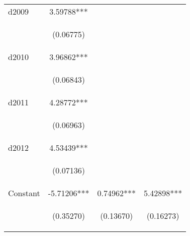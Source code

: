 \begin{center}
\begin{tabular}{lccc}
d2009 & 3.59788*** &  &  \\
\vspace{4pt} & \begin{footnotesize}(0.06775)\end{footnotesize} & \begin{footnotesize}\end{footnotesize} & \begin{footnotesize}\end{footnotesize} \\
d2010 & 3.96862*** &  &  \\
\vspace{4pt} & \begin{footnotesize}(0.06843)\end{footnotesize} & \begin{footnotesize}\end{footnotesize} & \begin{footnotesize}\end{footnotesize} \\
d2011 & 4.28772*** &  &  \\
\vspace{4pt} & \begin{footnotesize}(0.06963)\end{footnotesize} & \begin{footnotesize}\end{footnotesize} & \begin{footnotesize}\end{footnotesize} \\
d2012 & 4.53439*** &  &  \\
\vspace{4pt} & \begin{footnotesize}(0.07136)\end{footnotesize} & \begin{footnotesize}\end{footnotesize} & \begin{footnotesize}\end{footnotesize} \\
Constant & -5.71206*** & 0.74962*** & 5.42898*** \\
 & \begin{footnotesize}(0.35270)\end{footnotesize} & \begin{footnotesize}(0.13670)\end{footnotesize} & \begin{footnotesize}(0.16273)\end{footnotesize} \\

\end{tabular}
\end{center}
